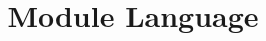 \documentclass[preprint]{sigplanconf}
\begin{document}

\title{Module Language}

\authorinfo{}{}{}

\maketitle


% 

% 

% 

% 

% 

% 

% 

% 




\nocite{*}


\clearpage
\appendix


% 

\end{document}
